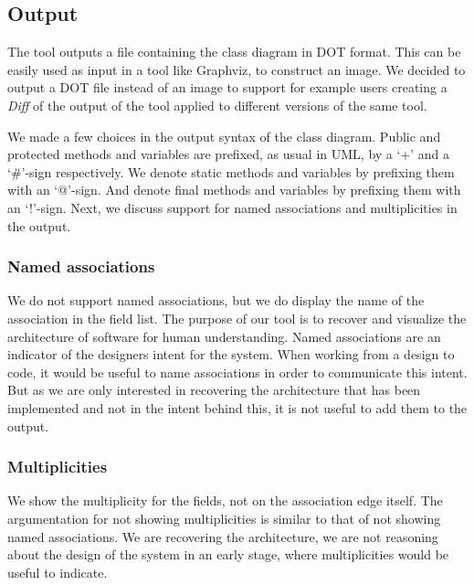 \subsection{Output}
	The tool outputs a file containing the class diagram in DOT format. 
	This can be easily used as input in a tool like Graphviz, to construct an image.
	We decided to output a DOT file instead of an image to support for example users creating a \textit{Diff} of the output of the tool 	applied to different versions of the same tool.
	
	We made a few choices in the output syntax of the class diagram. 
	Public and protected methods and variables are prefixed, as usual in UML, by a `+' and a `\#'-sign respectively.
	We denote static methods and variables by prefixing them with an `@'-sign.
	And denote final methods and variables by prefixing them with an `!'-sign.	
	Next, we discuss support for named associations and multiplicities in the output.

	\subsubsection{Named associations}
		We do not support named associations, but we do display the name of the association in the field list. 
		The purpose of our tool is to recover and visualize the architecture of software for human understanding.
		Named associations are an indicator of the designers intent for the system.
		When working from a design to code, it would be useful to name associations in order to communicate this intent.
		But as we are only interested in recovering the architecture that has been implemented and not in the intent behind this,
		it is not useful to add them to the output.
		
	\subsubsection{Multiplicities}
		We show the multiplicity for the fields, not on the association edge itself. 
		The argumentation for not showing multiplicities is similar to that of not showing named associations.
		We are recovering the architecture, we are not reasoning about the design of the system in an early stage, 
		where multiplicities would be useful to indicate.

